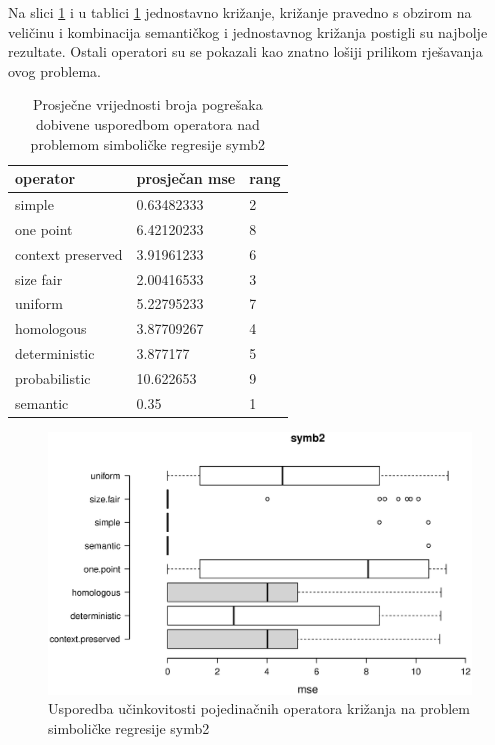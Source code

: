 Na slici \ref{symb2box} i u tablici \ref{symb2table} jednostavno križanje, križanje pravedno s obzirom na veličinu i kombinacija semantičkog i jednostavnog križanja postigli su najbolje rezultate. Ostali operatori su se pokazali kao znatno lošiji prilikom rješavanja ovog problema.

\begin{table}[H]
 	\centering
 \caption{Prosječne vrijednosti broja pogrešaka dobivene usporedbom operatora nad problemom simboličke regresije symb2}
    \begin{tabular}{| l | l | l |}
    \hline
    \textbf{operator} & \textbf{prosječan mse}  & \textbf{rang}\\ \hline
    simple & 0.63482333 & 2\\ \hline
    one point & 6.42120233 & 8\\ \hline
    context preserved & 3.91961233 & 6\\ \hline
    size fair & 2.00416533 & 3\\ \hline
    uniform & 5.22795233 & 7\\ \hline
    homologous & 3.87709267 & 4\\ \hline
    deterministic &3.877177 & 5\\ \hline
    probabilistic & 10.622653 & 9\\ \hline
    semantic & 0.35 & 1\\ \hline
    \end{tabular}
    
   
    \label{symb2table}
\end{table}

\begin{figure}[H]
	\centering
	\includegraphics[trim=0cm 4cm 0cm 0cm, scale=0.6]{./slike/boxPlots/symb2.eps}
	\caption{Usporedba učinkovitosti pojedinačnih operatora križanja na problem simboličke regresije symb2}
	\label{symb2box}
\end{figure}

